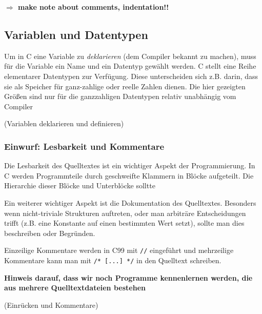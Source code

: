 \begin{framed}
 \iflecturer
 \textbf{$\Rightarrow$ make note about comments, indentation!!}
 \fi
\end{framed}

\subsection{Variablen und Datentypen}
\iflecturer
\begin{framed}
\end{framed}
\fi

Um in C eine Variable zu \emph{deklarieren} (dem Compiler bekannt zu machen), muss für die Variable ein Name und ein Datentyp gewählt werden.
C stellt eine Reihe elementarer Datentypen zur Verfügung.
Diese unterscheiden sich z.B. darin, dass sie als Speicher für ganz-zahlige oder reelle Zahlen dienen.
Die hier gezeigten Größen sind nur für die ganzzahligen Datentypen relativ unabhängig vom Compiler

\iflecturer
\begin{framed}
  \slide{} (Variablen deklarieren und definieren)
\end{framed}
\fi

\subsubsection{Einwurf: Lesbarkeit und Kommentare}

Die Lesbarkeit des Quelltextes ist ein wichtiger Aspekt der Programmierung.
In C werden Programmteile durch geschweifte Klammern in Blöcke aufgeteilt.
Die Hierarchie dieser Blöcke und Unterblöcke solltte 

Ein weiterer wichtiger Aspekt ist die Dokumentation des Quelltextes.
Besonders wenn nicht-triviale Strukturen auftreten, oder man arbiträre Entscheidungen trifft (z.B. eine Konstante auf einen bestimmten Wert setzt), sollte man dies beschreiben oder Begründen.

Einzeilige Kommentare werden in C99 mit \texttt{//} eingeführt und mehrzeilige Kommentare kann man mit \texttt{/* [...] */} in den Quelltext schreiben.

\iflecturer
\begin{framed}
  \noindent\textbf{Hinweis darauf, dass wir noch Programme kennenlernen werden, die aus mehrere Quelltextdateien bestehen}
\end{framed}
\fi

\iflecturer
\begin{framed}
  \slide{} (Einrücken und Kommentare)
\end{framed}
\fi

